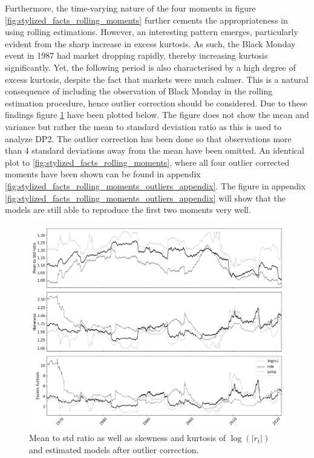 Furthermore, the time-varying nature of the four moments in figure \ref{fig:stylized_facts_rolling_moments} further cements the appropriateness in using rolling estimations. However, an interesting pattern emerges, particularly evident from the sharp increase in excess kurtosis. As such, the Black Monday event in 1987 had market dropping rapidly, thereby increasing kurtosis significantly. Yet, the following period is also characterised by a high degree of excess kurtosis, despite the fact that markets were much calmer. This is a natural consequence of including the observation of Black Monday in the rolling estimation procedure, hence outlier correction should be considered. Due to these findings figure \ref{fig:stylized_facts_rolling_moments_outliers} have been plotted below. The figure does not show the mean and variance but rather the mean to standard deviation ratio as this is used to analyze DP2. The outlier correction has been done so that observations more than 4 standard deviations away from the mean have been omitted. An identical plot to \ref{fig:stylized_facts_rolling_moments}, where all four outlier corrected moments have been shown can be found in appendix \ref{fig:stylized_facts_rolling_moments_outliers_appendix}. The figure in appendix \ref{fig:stylized_facts_rolling_moments_outliers_appendix} will show that the models are still able to reproduce the first two moments very well.


\begin{figure}[H] 
    \centering
    \includegraphics[width=1.0\textwidth]{analysis/stylized_facts/images/rolling_moments_abs.png}
    \caption{Mean to std ratio as well as skewness and kurtosis of $\log(|r_t|)$ and estimated models after outlier correction.}
    \label{fig:stylized_facts_rolling_moments_outliers} 
\end{figure}

